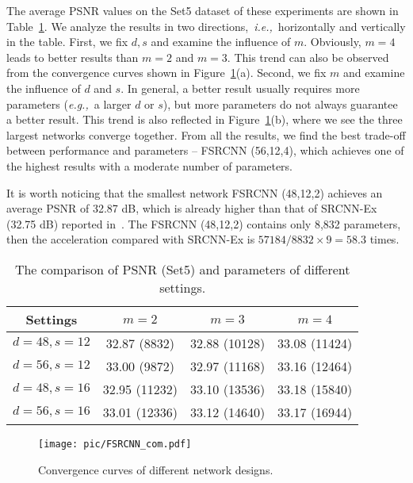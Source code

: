 \documentclass[runningheads]{llncs}
\newcommand{\eg}{\emph{e.g.,}}
\newcommand{\ie}{\emph{i.e.,}}
\begin{document}
The average PSNR values on the Set5 dataset of these experiments are shown in Table~\ref{tab:settings}. We analyze the results in two directions,~\ie~horizontally and vertically in the table. First, we fix $d,s$ and examine the influence of $m$. Obviously, $m=4$ leads to better results than $m=2$ and $m=3$. This trend can also be observed from the convergence curves shown in Figure~\ref{fig:com}(a).
Second, we fix $m$ and examine the influence of $d$ and $s$. In general, a better result usually requires more parameters (\eg~a larger $d$ or $s$), but more parameters do not always guarantee a better result. This trend is also reflected in Figure~\ref{fig:com}(b), where we see the three largest networks converge together. From all the results, we find the best trade-off between performance and parameters -- FSRCNN (56,12,4), which achieves one of the highest results with a moderate number of parameters.

It is worth noticing that the smallest network FSRCNN (48,12,2) achieves an average PSNR of 32.87 dB, which is already higher than that of SRCNN-Ex (32.75 dB) reported in~\cite{Dong2015}. The FSRCNN (48,12,2) contains only 8,832 parameters, then the acceleration compared with SRCNN-Ex is $57184/8832\times 9=58.3$ times.



\begin{table}[t]
\caption{The comparison of PSNR (Set5) and parameters of different settings.}\label{tab:settings}
\begin{center}
\begin{tabular}{|c|c|c|c|}
\hline
  Settings &  $m=2$ & $m=3$ & $m=4$ \\

\hline
$d=48,s=12$ & 32.87 (8832) & 32.88 (10128) & 33.08 (11424)\\
\hline
$d=56,s=12$ & 33.00 (9872) & 32.97 (11168) & 33.16 (12464)\\
\hline
$d=48,s=16$ & 32.95 (11232) & 33.10 (13536) & 33.18 (15840)\\
\hline
$d=56,s=16$ & 33.01 (12336) & 33.12 (14640) & 33.17 (16944)\\
\hline

\end{tabular}
\end{center}
\vspace{-0.45cm}
\end{table}

\begin{figure}[t]\footnotesize
\centering
  \texttt{[image: pic/FSRCNN\_com.pdf]}
\caption{Convergence curves of different network designs.}
  \label{fig:com}
\end{figure}
\end{document}

